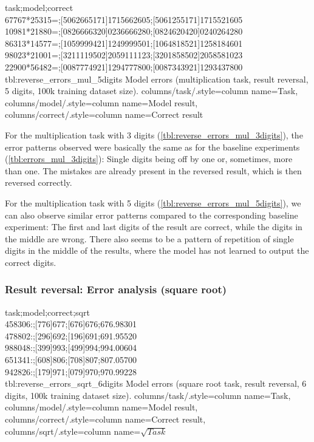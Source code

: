 {
task;model;correct\\
67767*25315=;[5062665171]1715662605;[5061255171]1715521605\\
10981*21880=;[0826666320]0236666280;[0824620420]0240264280\\
86313*14577=;[1059999421]1249999501;[1064818521]1258184601\\
98023*21001=;[3211119502]2059111123;[3201858502]2058581023\\
22900*56482=;[0087774921]1294777800;[0087343921]1293437800\\
}
{tbl:reverse_errors_mul_5digits}
{
    Model errors (multiplication task, result reversal, 5 digits, 100k training dataset size).
}
{
    columns/task/.style={column name={Task}},
    columns/model/.style={column name={Model result}},
    columns/correct/.style={column name={Correct result}}
}

For the multiplication task with 3 digits (\cref{tbl:reverse_errors_mul_3digits}), the error patterns observed were basically the same as for the baseline experiments  (\cref{tbl:errors_mul_3digits}): Single digits being off by one or, sometimes, more than one.
The mistakes are already present in the reversed result,
which is then reversed correctly.

For the multiplication task with 5 digits (\cref{tbl:reverse_errors_mul_5digits}), we can also observe similar error patterns compared to the corresponding baseline experiment: The first and last digits of the result are correct, while the digits in the middle are wrong.
There also seems to be a pattern of repetition of single digits in the middle of the results, where the model has not learned to output the correct digits.

\subsubsection{Result reversal: Error analysis (square root)}

{
task;model;correct;sqrt\\
458306:;[776]677;[676]676;676.98301\\
478802:;[296]692;[196]691;691.95520\\
988048:;[399]993;[499]994;994.00604\\
651341:;[608]806;[708]807;807.05700\\
942826:;[179]971;[079]970;970.99228\\
}
{tbl:reverse_errors_sqrt_6digits}
{
    Model errors (square root task, result reversal, 6 digits, 100k training dataset size).
}
{
    columns/task/.style={column name={Task}},
    columns/model/.style={column name={Model result}},
    columns/correct/.style={column name={Correct result}},
    columns/sqrt/.style={column name={$\sqrt{Task}$}}
}

